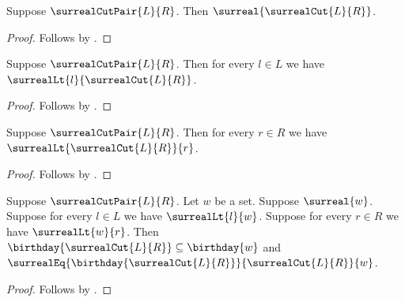 \begin{corollary}\label{surreal_cut_pair_is_surreal}
    Suppose $\surrealCutPair{L}{R}$.
    Then $\surreal{\surrealCut{L}{R}}$.
\end{corollary}
\begin{proof}
    Follows by
        .
\end{proof}

\begin{corollary}\label{surreal_cut_pair_left}
    Suppose $\surrealCutPair{L}{R}$.
    Then for every $l\in L$ we have
        $\surrealLt{l}{\surrealCut{L}{R}}$.
\end{corollary}
\begin{proof}
    Follows by
        .
\end{proof}

\begin{corollary}\label{surreal_cut_pair_right}
    Suppose $\surrealCutPair{L}{R}$.
    Then for every $r\in R$ we have
        $\surrealLt{\surrealCut{L}{R}}{r}$.
\end{corollary}
\begin{proof}
    Follows by
        .
\end{proof}

\begin{corollary}\label{surreal_cut_pair_simplest}
    Suppose $\surrealCutPair{L}{R}$.
    Let $w$ be a set.
    Suppose $\surreal{w}$.
    Suppose for every $l\in L$ we have $\surrealLt{l}{w}$.
    Suppose for every $r\in R$ we have $\surrealLt{w}{r}$.
    Then $\birthday{\surrealCut{L}{R}}\subseteq\birthday{w}$ and
        $\surrealEq{\birthday{\surrealCut{L}{R}}}
            {\surrealCut{L}{R}}{w}$.
\end{corollary}
\begin{proof}
    Follows by
        .
\end{proof}

